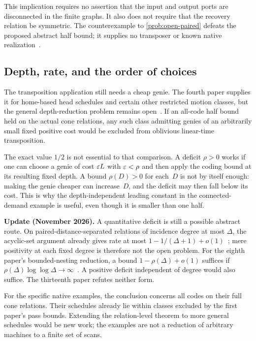 This implication requires no assertion that the input and output ports are disconnected in the finite graphs. It also does not require that the recovery relation be symmetric. The counterexample to \cref{prob:open-paired} defeats the proposed abstract half bound; it supplies no transposer or known native realization~\cite{StorageCodes2026}.

\subsection{Depth, rate, and the order of choices}
The transposition application still needs a cheap genie. The fourth paper supplies it for home-based head schedules and certain other restricted motion classes, but the general depth-reduction problem remains open~\cite{BrendeCurved}. If an all-code half bound held on the actual cone relations, any such class admitting genies of an arbitrarily small fixed positive cost would be excluded from oblivious linear-time transposition.

The exact value $1/2$ is not essential to that comparison. A deficit $\rho>0$ works if one can choose a genie of cost $\varepsilon L$ with $\varepsilon<\rho$ and then apply the coding bound at its resulting fixed depth. A bound $\rho(D)>0$ for each~$D$ is not by itself enough: making the genie cheaper can increase~$D$, and the deficit may then fall below its cost. This is why the depth-independent leading constant in the connected-demand example is useful, even though it is smaller than one half.

\textbf{Update (November 2026).} A quantitative deficit is still a possible abstract route. On paired-distance-separated relations of incidence degree at most $\Delta$, the acyclic-set argument already gives rate at most $1-1/(\Delta+1)+o(1)$~\cite[Proposition~4.14]{BrendeCurved}; mere positivity at each fixed degree is therefore not the open problem. For the eighth paper's bounded-nesting reduction, a bound $1-\rho(\Delta)+o(1)$ suffices if $\rho(\Delta)\log\log\Delta\to\infty$~\cite[Remark~6.5]{BoundedNesting2026}. A positive deficit independent of degree would also suffice. The thirteenth paper refutes neither form.

For the specific native examples, the conclusion concerns all codes on their full cone relations. Their schedules already lie within classes excluded by the first paper's pass bounds. Extending the relation-level theorem to more general schedules would be new work; the examples are not a reduction of arbitrary machines to a finite set of scans.

